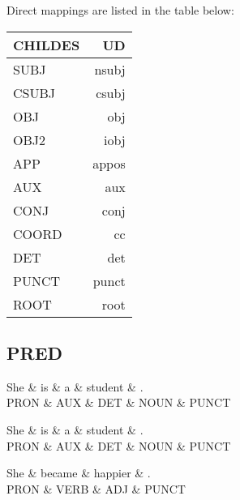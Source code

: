 Direct mappings are listed in the table below:
\begin{table}[h!]
\begin{tabular}{@{}lr@{}}
\toprule
\textbf{CHILDES} & \textbf{UD} & \\ \midrule
SUBJ & nsubj & \\
CSUBJ & csubj & \\
OBJ & obj & \\
OBJ2 & iobj & \\
APP & appos & \\
AUX & aux & \\
CONJ & conj & \\
COORD & cc & \\
DET & det & \\
PUNCT & punct & \\
ROOT & root & \\\bottomrule
\end{tabular}
\end{table}


\subsection{PRED}
\begin{dependency}
	\begin{deptext}
	She \& is \& a \& student \& .\\
	PRON \& AUX \& DET \& NOUN \& PUNCT\\
	\end{deptext}
\end{dependency}

\begin{dependency}
	\begin{deptext}
	She \& is \& a \& student \& .\\
	PRON \& AUX \& DET \& NOUN \& PUNCT\\
	\end{deptext}
\end{dependency}

\begin{dependency}
	\begin{deptext}
	She \& became \& happier \& .\\
	PRON \& VERB \& ADJ \& PUNCT\\
	\end{deptext}
\end{dependency}

